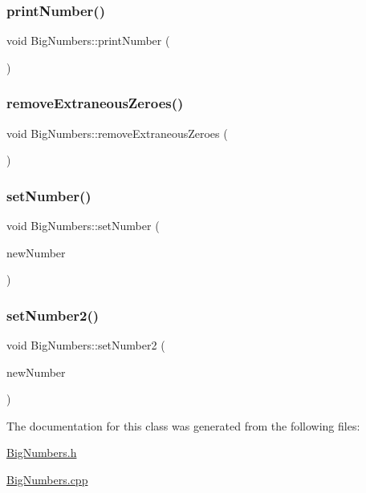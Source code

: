 \subsubsection{\texorpdfstring{print\+Number()}{printNumber()}}
{\footnotesize\ttfamily void Big\+Numbers\+::print\+Number (\begin{DoxyParamCaption}{ }\end{DoxyParamCaption})}

\mbox{\label{class_big_numbers_a91e77188004279bd26af52d1a937c8ca}} 
\subsubsection{\texorpdfstring{remove\+Extraneous\+Zeroes()}{removeExtraneousZeroes()}}
{\footnotesize\ttfamily void Big\+Numbers\+::remove\+Extraneous\+Zeroes (\begin{DoxyParamCaption}{ }\end{DoxyParamCaption})}

\mbox{\label{class_big_numbers_abf400d0630712c0894101f578960b155}} 
\subsubsection{\texorpdfstring{set\+Number()}{setNumber()}}
{\footnotesize\ttfamily void Big\+Numbers\+::set\+Number (\begin{DoxyParamCaption}\item[{int}]{new\+Number }\end{DoxyParamCaption})}

\mbox{\label{class_big_numbers_a6b9f005b46c0112d7fff0a5bc685b095}} 
\subsubsection{\texorpdfstring{set\+Number2()}{setNumber2()}}
{\footnotesize\ttfamily void Big\+Numbers\+::set\+Number2 (\begin{DoxyParamCaption}\item[{\mbox{\hyperlink{class_big_numbers}{Big\+Numbers}}}]{new\+Number }\end{DoxyParamCaption})}



The documentation for this class was generated from the following files\+:\begin{DoxyCompactItemize}
\item 
\mbox{\hyperlink{_big_numbers_8h}{Big\+Numbers.\+h}}\item 
\mbox{\hyperlink{_big_numbers_8cpp}{Big\+Numbers.\+cpp}}\end{DoxyCompactItemize}
